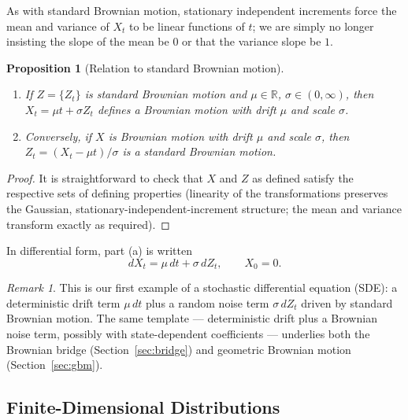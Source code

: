 \documentclass[12pt,openany]{book}
\newtheorem{proposition}[theorem]{Proposition}
\theoremstyle{definition}
\theoremstyle{remark}
\newtheorem{remark}[theorem]{Remark}
\newcommand{\R}{\mathbb{R}}
\begin{document}
As with standard Brownian motion, stationary independent increments force the mean and variance of $X_t$ to be linear functions of $t$; we are simply no longer insisting the slope of the mean be $0$ or that the variance slope be $1$.
 
\begin{proposition}[Relation to standard Brownian motion]
\label{prop:relation}
\begin{enumerate}[label=(\alph*)]
    \item If $Z=\{Z_t\}$ is standard Brownian motion and $\mu\in\R$, $\sigma\in(0,\infty)$, then $X_t = \mu t + \sigma Z_t$ defines a Brownian motion with drift $\mu$ and scale $\sigma$.
    \item Conversely, if $X$ is Brownian motion with drift $\mu$ and scale $\sigma$, then $Z_t = (X_t-\mu t)/\sigma$ is a standard Brownian motion.
\end{enumerate}
\end{proposition}
\begin{proof}
It is straightforward to check that $X$ and $Z$ as defined satisfy the respective sets of defining properties (linearity of the transformations preserves the Gaussian, stationary-independent-increment structure; the mean and variance transform exactly as required).
\end{proof}
 
In differential form, part (a) is written
\begin{equation}
    dX_t = \mu\,dt + \sigma\,dZ_t, \qquad X_0=0. \tag{18.2.1}
\end{equation}
 
\begin{remark}
This is our first example of a stochastic differential equation (SDE): a deterministic drift term $\mu\,dt$ plus a random noise term $\sigma\,dZ_t$ driven by standard Brownian motion. The same template — deterministic drift plus a Brownian noise term, possibly with state-dependent coefficients — underlies both the Brownian bridge (Section~\ref{sec:bridge}) and geometric Brownian motion (Section~\ref{sec:gbm}).
\end{remark}
 
\subsection{Finite-Dimensional Distributions}
 
\end{document}
